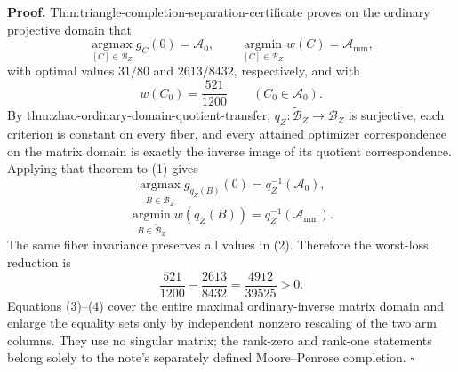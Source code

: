 \textbf{Proof.}
Thm:triangle-completion-separation-certificate proves on the ordinary projective domain that
\[
\operatorname*{argmax}_{[C]\in\mathcal B_Z}g_C(0)=\mathcal A_0,
\qquad
\operatorname*{argmin}_{[C]\in\mathcal B_Z}w(C)=\mathcal A_{\mathrm{mm}}, \tag{1}
\]
with optimal values \(31/80\) and \(2613/8432\), respectively, and with
\[
w(C_0)=\frac{521}{1200}
\qquad(C_0\in\mathcal A_0).                                      \tag{2}
\]
By thm:zhao-ordinary-domain-quotient-transfer, \(q_Z:\widetilde{\mathcal B}_Z\to\mathcal B_Z\) is surjective, each criterion is constant on every fiber, and every attained optimizer correspondence on the matrix domain is exactly the inverse image of its quotient correspondence.  Applying that theorem to (1) gives
\[
\operatorname*{argmax}_{B\in\widetilde{\mathcal B}_Z}g_{q_Z(B)}(0)
=q_Z^{-1}(\mathcal A_0),
\]
\[
\operatorname*{argmin}_{B\in\widetilde{\mathcal B}_Z}w(q_Z(B))
=q_Z^{-1}(\mathcal A_{\mathrm{mm}}).                              \tag{3}
\]
The same fiber invariance preserves all values in (2).  Therefore the worst-loss reduction is
\[
\frac{521}{1200}-\frac{2613}{8432}
=\frac{4912}{39525}>0.                                            \tag{4}
\]
Equations (3)--(4) cover the entire maximal ordinary-inverse matrix domain and enlarge the equality sets only by independent nonzero rescaling of the two arm columns.  They use no singular matrix; the rank-zero and rank-one statements belong solely to the note's separately defined Moore--Penrose completion. \(\square\)